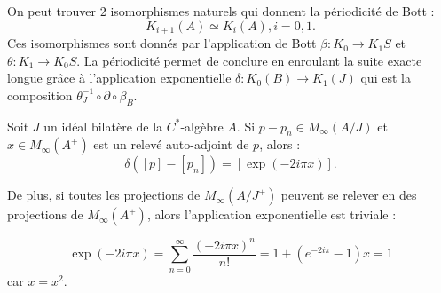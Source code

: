 On peut trouver $2$ isomorphismes naturels qui donnent la périodicité de Bott :
\[K_{i+1}(A)\simeq K_i(A), i=0,1.\]
Ces isomorphismes sont donnés par l'application de Bott $\beta : K_0 \rightarrow K_1 S$ et $\theta :  K_1 \rightarrow K_0 S$. La périodicité permet de conclure en enroulant la suite exacte longue grâce à l'application exponentielle $\delta : K_0(B)\rightarrow K_1(J)$ qui est la composition $\theta_J^{-1}\circ \partial \circ \beta_B$.\\

\begin{prop} Soit $J$ un idéal bilatère de la $C^*$-algèbre $A$. Si $p-p_n \in M_\infty (A/J)$ et $x\in M_\infty (A^{+})$ est un relevé auto-adjoint de $p$, alors :
\[\delta([p]-[p_n])=[\exp(-2i\pi x)].\]
\label{exp}
\end{prop}
De plus, si toutes les projections de $M_\infty(A/J^{+})$ peuvent se relever en des projections de $M_\infty(A^{+})$, alors l'application exponentielle est triviale :

\[\exp(-2i\pi x )=\sum_{n=0}^\infty \frac{(-2i\pi x)^n}{n!}=1+(e^{-2i\pi}-1) x =1\]
car $x=x^2$.\\

